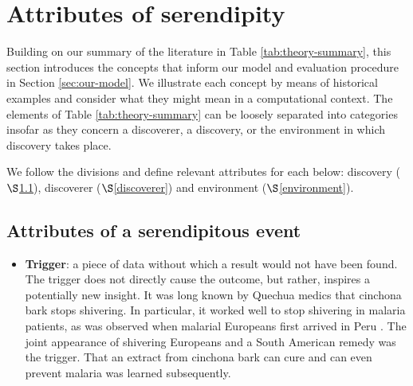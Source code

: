 \section{Attributes of serendipity} \label{attributes}

Building on our summary of the literature in Table
\ref{tab:theory-summary}, this section introduces the concepts that
inform our model and evaluation procedure in Section
\ref{sec:our-model}. We illustrate each concept by means of historical
examples and consider what they might mean in a computational context.
The elements of Table \ref{tab:theory-summary} can be loosely separated into categories insofar as they concern a discoverer, a discovery, or the environment in which discovery takes place.


We follow the divisions and define relevant attributes for each below: discovery ($\S$\ref{discovery}), discoverer ($\S$\ref{discoverer}) and
environment ($\S$\ref{environment}).


\subsection{Attributes of a serendipitous event}\label{discovery}

\begin{itemize}
\item \textbf{Trigger}: a piece of data without which a result would
  not have been found. The trigger does not directly cause the
  outcome, but rather, inspires a potentially new insight.  It was
  long known by Quechua medics that cinchona bark stops shivering.  In
  particular, it worked well to stop shivering in malaria patients, as
  was observed when malarial Europeans first arrived in Peru
  \cite[pp.~75--77]{desowitz1997gave}.  The joint appearance of
  shivering Europeans and a South American remedy was the trigger.
  That an extract from cinchona bark can cure and can even prevent
  malaria was learned subsequently.
\end{itemize}

